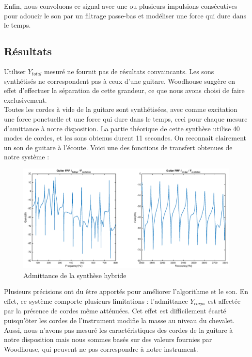 Enfin, nous convoluons ce signal avec une ou plusieurs impulsions consécutives pour adoucir le son par un filtrage passe-bas et modéliser une force qui dure dans le temps.

\subsection{Résultats}
%

Utiliser $Y_{total}$ mesuré ne fournit pas de résultats convaincants. Les sons synthétisés ne correspondent pas à ceux d'une guitare. Woodhouse suggère en effet d'effectuer la séparation de cette grandeur, ce que nous avons choisi de faire exclusivement.\\

Toutes les cordes à vide de la guitare sont synthétisées, avec comme excitation une force ponctuelle et une force qui dure dans le temps, ceci pour chaque mesure d'amittance à notre disposition. La partie théorique de cette synthèse utilise 40 modes de cordes, et les sons obtenus durent 11 secondes. On reconnait clairement un son de guitare à l'écoute. Voici une des fonctions de transfert obtenues de notre système :

\begin{figure}[h]
\centering
\includegraphics[width=\linewidth]{figures/FRF_E2.eps}
\caption{Admittance de la synthèse hybride}
\label{fig:frf_fig_1}
\end{figure}


Plusieurs précisions ont du être apportés pour améliorer l'algorithme et le
son. En effet, ce système comporte plusieurs limitations : l'admittance
$Y_{corps}$ est affectée par la présence de cordes même atténuées. Cet effet est difficilement écarté puisqu'ôter les cordes de l'instrument modifie la masse au niveau du chevalet. Aussi, nous n'avons pas mesuré les caractéristiques des cordes de la guitare à notre disposition mais nous sommes basés sur des valeurs fournies par Woodhouse, qui peuvent ne pas correspondre à notre instrument.\\


